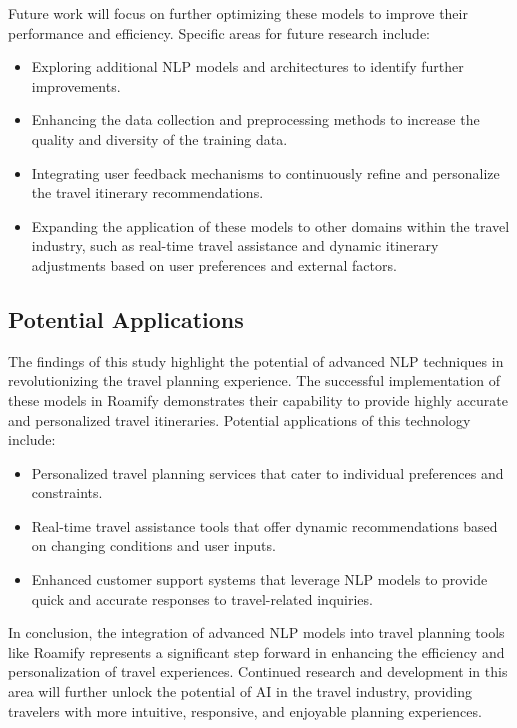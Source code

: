 \documentclass[conference]{IEEEtran}
\begin{document}
Future work will focus on further optimizing these models to improve their performance and efficiency. Specific areas for future research include:
\begin{itemize}
    \item Exploring additional NLP models and architectures to identify further improvements.
    \item Enhancing the data collection and preprocessing methods to increase the quality and diversity of the training data.
    \item Integrating user feedback mechanisms to continuously refine and personalize the travel itinerary recommendations.
    \item Expanding the application of these models to other domains within the travel industry, such as real-time travel assistance and dynamic itinerary adjustments based on user preferences and external factors.
\end{itemize}

\subsection{Potential Applications}

The findings of this study highlight the potential of advanced NLP techniques in revolutionizing the travel planning experience. The successful implementation of these models in Roamify demonstrates their capability to provide highly accurate and personalized travel itineraries. Potential applications of this technology include:
\begin{itemize}
    \item Personalized travel planning services that cater to individual preferences and constraints.
    \item Real-time travel assistance tools that offer dynamic recommendations based on changing conditions and user inputs.
    \item Enhanced customer support systems that leverage NLP models to provide quick and accurate responses to travel-related inquiries.
\end{itemize}

In conclusion, the integration of advanced NLP models into travel planning tools like Roamify represents a significant step forward in enhancing the efficiency and personalization of travel experiences. Continued research and development in this area will further unlock the potential of AI in the travel industry, providing travelers with more intuitive, responsive, and enjoyable planning experiences.
\end{document}
